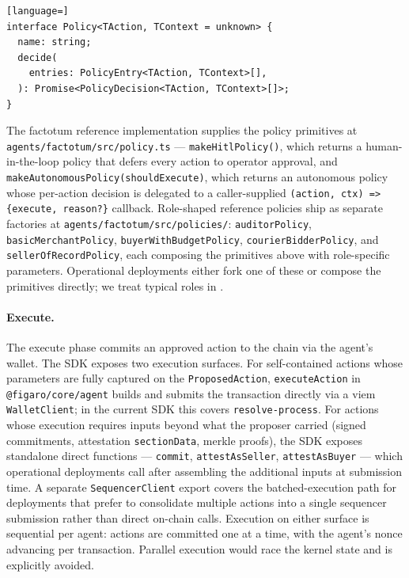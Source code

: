 \documentclass[11pt,a4paper]{article}
\theoremstyle{definition}
\theoremstyle{remark}
\begin{document}
\begin{lstlisting}[language=]
interface Policy<TAction, TContext = unknown> {
  name: string;
  decide(
    entries: PolicyEntry<TAction, TContext>[],
  ): Promise<PolicyDecision<TAction, TContext>[]>;
}
\end{lstlisting}

The factotum reference implementation supplies the policy
primitives at \texttt{agents/factotum/src/policy.ts} ---
\texttt{makeHitlPolicy()}, which returns a human-in-the-loop
policy that defers every action to operator approval, and
\texttt{makeAutonomousPolicy(shouldExecute)}, which returns an
autonomous policy whose per-action decision is delegated to a
caller-supplied \texttt{(action, ctx) =>
\{execute, reason?\}} callback. Role-shaped reference policies
ship as separate factories at
\texttt{agents/factotum/src/policies/}:
\texttt{auditorPolicy}, \texttt{basicMerchantPolicy},
\texttt{buyerWithBudgetPolicy}, \texttt{courierBidderPolicy}, and
\texttt{sellerOfRecordPolicy}, each composing the primitives above
with role-specific parameters. Operational deployments either
fork one of these or compose the primitives directly; we treat
typical roles in .

\paragraph{Execute.}
The execute phase commits an approved action to the chain via the
agent's wallet. The SDK exposes two execution surfaces. For
self-contained actions whose parameters are fully captured on the
\texttt{ProposedAction}, \texttt{executeAction} in
\texttt{@figaro/core/agent} builds and submits the transaction
directly via a viem \texttt{WalletClient}; in the current SDK this
covers \texttt{resolve-process}. For actions whose execution
requires inputs beyond what the proposer carried (signed
commitments, attestation \texttt{sectionData}, merkle proofs), the
SDK exposes standalone direct functions --- \texttt{commit},
\texttt{attestAsSeller}, \texttt{attestAsBuyer} --- which
operational deployments call after assembling the additional
inputs at submission time. A separate \texttt{SequencerClient}
export covers the batched-execution path for deployments that
prefer to consolidate multiple actions into a single sequencer
submission rather than direct on-chain calls. Execution on either
surface is sequential per agent: actions are committed one at a
time, with the agent's nonce advancing per transaction. Parallel
execution would race the kernel state and is explicitly avoided.
\end{document}
